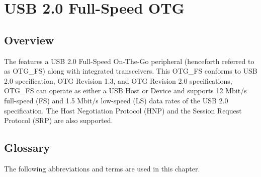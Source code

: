 \documentclass[main\_\_EN.tex]{subfiles}
\begin{document}

\ifglobal
\else
    \listoftodos
    {\let\clearpage\relax \listofdonetodos}
    \tableofcontents
\fi










\hypertarget{usbotgfs}{}
\chapter{USB 2.0 Full-Speed OTG }
\label{mod:usbotgfs}

\section{Overview}
The \chipname{} features a USB 2.0 Full-Speed On-The-Go peripheral (henceforth referred to as OTG\_FS) along with integrated transceivers. This OTG\_FS conforms to USB 2.0 specification, OTG Revision 1.3, and OTG Revision 2.0 specifications, OTG\_FS can operate as either a USB Host or Device and supports 12 Mbit/s full-speed (FS) and 1.5 Mbit/s low-speed (LS) data rates of the USB 2.0 specification. The Host Negotiation Protocol (HNP) and the Session Request Protocol (SRP) are also supported.

\section{Glossary}

The following abbreviations and terms are used in this chapter.
\end{document}
